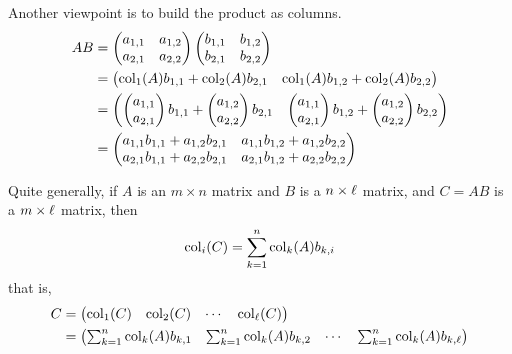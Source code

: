 \documentclass{ximera}
\begin{document}
Another viewpoint is to build the product as columns.  
\begin{align*}AB &= \begin{pmatrix}
a_{1,1} & a_{1,2}\\
a_{2,1} & a_{2,2}
\end{pmatrix}
\begin{pmatrix}
b_{1,1} & b_{1,2}\\
b_{2,1} & b_{2,2}
\end{pmatrix}\\
&= \begin{pmatrix}
\operatorname{col}_1(A)b_{1,1} + \operatorname{col}_2(A) b_{2,1} & \operatorname{col}_1(A)b_{1,2} + \operatorname{col}_2(A) b_{2,2}
\end{pmatrix}\\
&= \begin{pmatrix}
\begin{pmatrix}a_{1,1} \\ a_{2,1}\end{pmatrix}b_{1,1} + \begin{pmatrix}a_{1,2} \\ a_{2,2}\end{pmatrix}b_{2,1} & \begin{pmatrix}a_{1,1} \\ a_{2,1}\end{pmatrix}b_{1,2} + \begin{pmatrix}a_{1,2} \\ a_{2,2}\end{pmatrix}b_{2,2}
\end{pmatrix}\\
&= \begin{pmatrix}
a_{1,1}b_{1,1} + a_{1,2}b_{2,1} & a_{1,1}b_{1,2}+ a_{1,2}b_{2,2}\\
a_{2,1}b_{1,1} + a_{2,2}b_{2,1} & a_{2,1}b_{1,2} + a_{2,2}b_{2,2}
\end{pmatrix}
\end{align*}

Quite generally, if $A$ is an $m\times n$ matrix and $B$ is a $n\times
\ell$ matrix, and $C = AB$ is a $m\times \ell$ matrix, then
\[
\operatorname{col}_i(C) = \sum_{k=1}^n \operatorname{col}_k(A)b_{k,i}
\]
that is,
\begin{align*}
  C &= \begin{pmatrix} \operatorname{col}_1(C) & \operatorname{col}_2 (C) & \cdots & \operatorname{col}_{\ell}(C) \end{pmatrix}\\
  &=  \begin{pmatrix} \sum_{k=1}^n \operatorname{col}_k(A)b_{k,1} & \sum_{k=1}^n \operatorname{col}_k(A)b_{k,2} & \cdots & \sum_{k=1}^n \operatorname{col}_k(A)b_{k,\ell}\end{pmatrix}
\end{align*}
\end{document}
